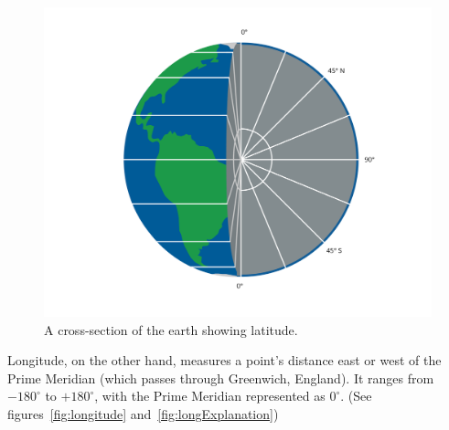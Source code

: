 \begin{figure}[htbp]
  \centering
  \includegraphics[width=.75\textwidth]{latExplanation.png}
  \caption{A cross-section of the earth showing latitude.}
  \label{fig:latitudeExplained}
\end{figure}
Longitude, on the other hand, measures a point's distance east or west
of the Prime Meridian (which passes through Greenwich, England). It
ranges from $-180^{\circ}$ to $+180^{\circ}$, with the Prime Meridian
represented as $0^{\circ}$. (See figures~\ref{fig:longitude} and~\ref{fig:longExplanation})

